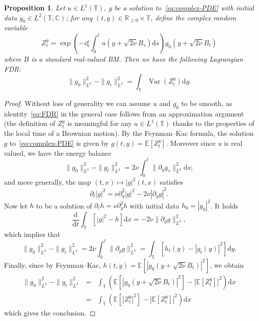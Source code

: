 \documentclass[11pt,oneside,reqno]{amsart}
\newcommand{\mathd}{\mathrm{d}}
\newcommand{\tmop}[1]{\ensuremath{\operatorname{#1}}}
\newtheorem{proposition}[theorem]{Proposition}
{\theoremstyle{remark}\newtheorem{remark}[theorem]{Remark}}
\numberwithin{equation}{section}
\begin{document}
\begin{proposition}
  \label{prop:FDR}Let $u \in L^1 (\mathbb{T})$, $g$ be a solution
  to~\eqref{eq:complex-PDE} with initial data $g_0 \in L^2 (\mathbb{T};
  \mathbb{C})$; for any $(t, y) \in \mathbb{R}_{\geqslant 0} \times
  \mathbb{T}$, define the complex random variable
  \[ Z^y_t = \exp \left( - i \xi \int_0^t u \left( y + \sqrt{2 \nu} B_s
     \right) \mathd s \right) g_0 \left( y + \sqrt{2 \nu} B_t \right) \]
  where $B$ is a standard real-valued BM. Then we have the following
  Lagrangian FDR:
  \begin{equation}
    \| g_0 \|_{L^2}^2 - \| g_t \|_{L^2}^2 = \int_{\mathbb{T}} \tmop{Var}
    (Z^y_t) \mathd y. \label{eq:FDR}
  \end{equation}
\end{proposition}

\begin{proof}
  Without loss of generality we can assume $u$ and $g_0$ to be smooth, as
  identity~\eqref{eq:FDR} in the general case follows from an approximation
  argument (the definition of $Z^y_t$ is meaningful for any $u \in L^1
  (\mathbb{T})$ thanks to the properties of the local time of a Brownian
  motion). By the Feynman--Kac formula, the solution $g$
  to~\eqref{eq:complex-PDE} is given by $g (t, y) =\mathbb{E} [Z^y_t]$.
  Moreover since $u$ is real valued, we have the energy balance
  \[ \| g_0 \|_{L^2}^2 - \| g_t \|_{L^2}^2 = 2 \nu \int_0^t \| \partial_y g_s
     \|_{L^2}^2 \mathd s ; \]
  and more generally, the map $(t, x) \mapsto | g |^2 (t, x)$ satisfies
  \[ \partial_t | g |^2 = \nu \partial_y^2 | g |^2 - 2 \nu | \partial_y g |^2
     . \]
  Now let $h$ to be a solution of $\partial_t h = \nu \partial_y^2 h$ with
  initial data $h_0 = | g_0 |^2$. It holds
  \[ \frac{\mathd}{\mathd t} \int_{\mathbb{T}} [| g |^2 - h] \mathd x = - 2
     \nu \| \partial_y g \|_{L^2}^2, \]
  which implies that
  \[ \| g_0 \|_{L^2}^2 - \| g_t \|_{L^2}^2 = 2 \nu \int_0^t \| \partial_y g
     \|_{L^2}^2 = \int_{\mathbb{T}} [h_t (y) - | g_t (y) |^2] \mathd y. \]
  Finally, since by Feynman--Kac, $h (t, y) =\mathbb{E} \left[ \left| g_0
  \left( y + \sqrt{2 \nu} B_t \right) \right|^2 \right]$, we obtain
  \[ \begin{array}{lll}
       \| g_0 \|_{L^2}^2 - \| g_t \|_{L^2}^2 & = & \int_{\mathbb{T}} \left(
       \mathbb{E} \left[ \left| g_0 \left( y + \sqrt{2 \nu} B_t \right)
       \right|^2 \right] - | \mathbb{E} [Z^y_t] |^2 \right) \mathd x\\
       & = & \int_{\mathbb{T}} (\mathbb{E} [| Z^y_t |^2] - | \mathbb{E}
       [Z^y_t] |^2) \mathd x
     \end{array} \]
  which gives the conclusion.
\end{proof}
\end{document}
